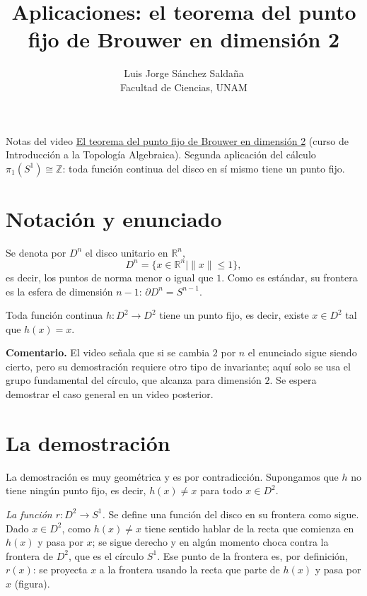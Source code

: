 \documentclass[11pt]{article}
\title{Aplicaciones: el teorema del punto fijo de Brouwer en dimensión 2}
\author{Luis Jorge Sánchez Saldaña\\[2pt]\small Facultad de Ciencias, UNAM}
\date{}
\begin{document}
\maketitle

\noindent\small Notas del video
\href{https://www.youtube.com/watch?v=Ba1E9TC3dKA}{\guillemotleft{}El teorema del punto fijo de Brouwer en dimensión 2\guillemotright{}}
(curso de Introducción a la Topología Algebraica). Segunda aplicación del cálculo $\pi_1(S^1)\cong\mathbb{Z}$: toda función continua del disco en sí mismo tiene un punto fijo.
\normalsize

\section*{Notación y enunciado}

Se denota por $D^n$ el disco unitario en $\mathbb{R}^n$,
\[
  D^n=\{x\in\mathbb{R}^n\mid \|x\|\le 1\},
\]
es decir, los puntos de norma menor o igual que $1$. Como es estándar, su frontera es la esfera de dimensión $n-1$: $\partial D^n=S^{n-1}$.

\begin{teo}
Toda función continua $h\colon D^2\to D^2$ tiene un punto fijo, es decir, existe $x\in D^2$ tal que $h(x)=x$.
\end{teo}

\noindent\textbf{Comentario.} El video señala que si se cambia $2$ por $n$ el enunciado sigue siendo cierto, pero su demostración requiere otro tipo de invariante; aquí solo se usa el grupo fundamental del círculo, que alcanza para dimensión $2$. Se espera demostrar el caso general en un video posterior.

\section*{La demostración}

La demostración es muy geométrica y es por contradicción. Supongamos que $h$ no tiene ningún punto fijo, es decir, $h(x)\neq x$ para todo $x\in D^2$.

\medskip\noindent\textit{La función $r\colon D^2\to S^1$.}
Se define una función del disco en su frontera como sigue. Dado $x\in D^2$, como $h(x)\neq x$ tiene sentido hablar de la recta que comienza en $h(x)$ y pasa por $x$; se sigue derecho y en algún momento choca contra la frontera de $D^2$, que es el círculo $S^1$. Ese punto de la frontera es, por definición, $r(x)$: se proyecta $x$ a la frontera usando la recta que parte de $h(x)$ y pasa por $x$ (figura).
\end{document}
